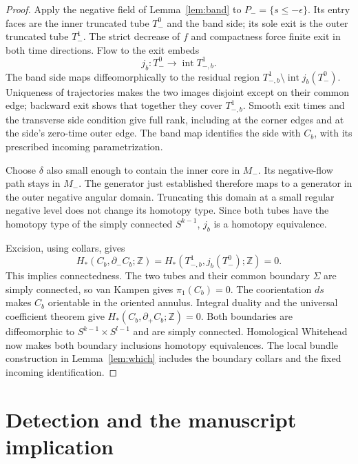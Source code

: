 \documentclass[11pt]{article}
\newcommand{\Z}{\mathbb Z}
\newcommand{\Int}{\operatorname{int}}
\begin{document}
\begin{proof}
Apply the negative field of Lemma~\ref{lem:band} to
$P_-=\{s\leq-\epsilon\}$. Its entry faces are the inner truncated
tube $T_-^0$ and the band side; its sole exit is the outer truncated
tube $T_-^1$. The strict decrease of $f$ and compactness force
finite exit in both time directions. Flow to the exit embeds
\[
 j_b:T_-^0\longrightarrow\Int T_{-,b}^1.
\]
The band side maps diffeomorphically to the residual region
$T_{-,b}^1\setminus\Int j_b(T_-^0)$.
Uniqueness of trajectories makes the two images disjoint except on
their common edge; backward exit shows that together they cover
$T_{-,b}^1$. Smooth exit times and the transverse side condition give
full rank, including at the corner edges and at the side's zero-time
outer edge. The band map identifies the side with $C_b$, with its
prescribed incoming parametrization.

Choose $\delta$ also small enough to contain the inner core in $M_-$.
Its negative-flow path stays in $M_-$. The generator just established
therefore maps to a generator in the outer negative angular domain.
Truncating this domain at a small regular negative level does not
change its homotopy type. Since both tubes have the homotopy type of
the simply connected $S^{k-1}$, $j_b$ is a homotopy equivalence.

Excision, using collars, gives
\[
 H_*(C_b,\partial_-C_b;\Z)
   =H_*(T_{-,b}^1,j_b(T_-^0);\Z)=0.
\]
This implies connectedness. The two tubes and their common boundary
$\Sigma$ are simply connected, so van Kampen gives $\pi_1(C_b)=0$.
The coorientation $ds$ makes $C_b$ orientable in the oriented annulus.
Integral duality and the universal coefficient theorem give
$H_*(C_b,\partial_+C_b;\Z)=0$. Both boundaries are diffeomorphic to
$S^{k-1}\times S^{l-1}$ and are simply connected.
Homological Whitehead now makes both boundary inclusions homotopy
equivalences. The local bundle construction in Lemma~\ref{lem:which}
includes the boundary collars and the fixed incoming identification.
\end{proof}

\section{Detection and the manuscript implication}
\end{document}
